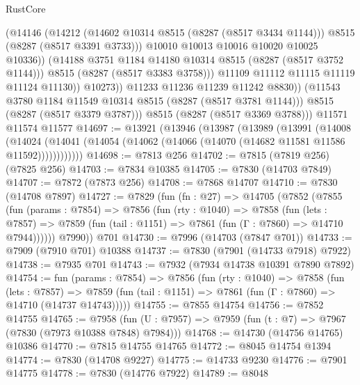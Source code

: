 \begin{lexlean}{RustCore}
\begin{coremodule}
                        (@14146
                          (@14212
                            (@14602 @10314 @8515 (@8287 (@8517 @3434 @1144)))
                            @8515
                            (@8287 (@8517 @3391 @3733)))
                          @10010
                          @10013
                          @10016
                          @10020
                          @10025
                          @10336))
                      (@14188 @3751 @1184 @14180 @10314 @8515 (@8287 (@8517 @3752 @1144)))
                      @8515
                      (@8287 (@8517 @3383 @3758)))
                    @11109
                    @11112
                    @11115
                    @11119
                    @11124
                    @11130))
                @10273))
            @11233
            @11236
            @11239
            @11242
            @8830))
        (@11543 @3780 @1184 @11549 @10314 @8515 (@8287 (@8517 @3781 @1144)))
        @8515
        (@8287 (@8517 @3379 @3787)))
      @8515
      (@8287 (@8517 @3369 @3788)))
    @11571
    @11574
    @11577
@14697 := @13921
    (@13946
      (@13987
        (@13989
          (@13991
            (@14008
              (@14024
                (@14041 (@14054 (@14062 (@14066 (@14070 (@14682 @11581 @11586 @11592))))))))))))
@14698 := @7813 @256
@14702 := @7815 (@7819 @256) (@7825 @256)
@14703 := @7834 @10385
@14705 := @7830 (@14703 @7849)
@14707 := @7872 (@7873 @256)
@14708 := @7868 @14707
@14710 := @7830 (@14708 @7897)
@14727 := @7829
    (fun (fn : @27) =>
    @14705
      (@7852
        (@7855
          (fun (params : @7854) =>
          @7856
            (fun (rty : @1040) =>
            @7858
              (fun (lets : @7857) =>
              @7859 (fun (tail : @1151) => @7861 (fun (Γ : @7860) => @14710 @7944))))))
        @7990))
    @701
@14730 := @7996 (@14703 (@7847 @701))
@14733 := @7909 (@7910 @701) @10388
@14737 := @7830 (@7901 (@14733 @7918) @7922)
@14738 := @7935 @701
@14743 := @7932 (@7934 @14738 @10391 @7890 @7892)
@14754 := fun (params : @7854) =>
  @7856
    (fun (rty : @1040) =>
    @7858
      (fun (lets : @7857) =>
      @7859 (fun (tail : @1151) => @7861 (fun (Γ : @7860) => @14710 (@14737 @14743)))))
@14755 := @7855 @14754
@14756 := @7852 @14755
@14765 := @7958
    (fun (U : @7957) => @7959 (fun (t : @7) => @7967 (@7830 (@7973 @10388 @7848) @7984)))
@14768 := @14730 (@14756 @14765) @10386
@14770 := @7815 @14755 @14765
@14772 := @8045 @14754 @1394
@14774 := @7830 (@14708 @9227)
@14775 := @14733 @9230
@14776 := @7901 @14775
@14778 := @7830 (@14776 @7922)
@14789 := @8048

\end{coremodule}
\end{lexlean}
